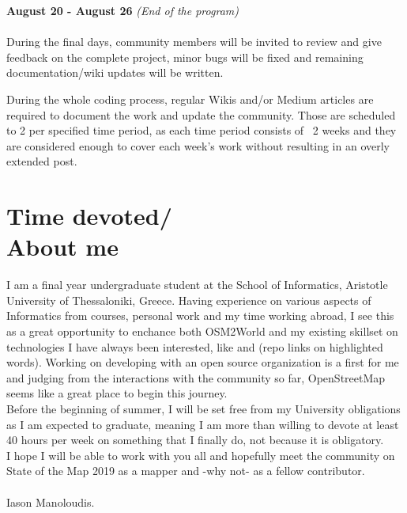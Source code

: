 \documentclass[margin,line]{res}
\begin{document}
\begin{resume}
\textbf{August 20 - August 26} \textit{(End of the program)} \\ \\
During the final days, community members will be invited to review and give feedback on the complete project, minor bugs will be fixed and remaining documentation/wiki updates will be written.

During the whole coding process, regular Wikis and/or Medium articles are required to document the work and update the community. Those are scheduled to 2 per specified time period, as each time period consists of ~2 weeks and they are considered enough to cover each week's work without resulting in an overly extended post.

\section{\sc \textbf{Time devoted/}\\ \textbf{About me}}
I am a final year undergraduate student at the School of Informatics, Aristotle University of Thessaloniki, Greece. Having experience on various aspects of Informatics from courses, personal work and my time working abroad, I see this as a great opportunity to enchance both OSM2World and my existing skillset on technologies I have always been interested, like \href{https://github.com/JayGhb/University-Projects/tree/master/Graphics-w-OpenGL}{\color{blue}{OpenGL}} and \href{https://github.com/JayGhb?utf8=\%E2\%9C\%93&tab=repositories&q=&type=&language=java}{\color{blue}{Java}} (repo links on highlighted words). Working on developing with an open source organization is a first for me and judging from the interactions with the community so far, OpenStreetMap seems like a great place to begin this journey. \\
Before the beginning of summer, I will be set free from my University obligations as I am expected to graduate, meaning I am more than willing to devote at least 40 hours per week on something that I finally do, not because it is obligatory.\\
I hope I will be able to work with you all and hopefully meet the community on State of the Map 2019 as a mapper and -why not- as a fellow contributor. \\ \\
Iason Manoloudis.


\end{resume}
\end{document}
